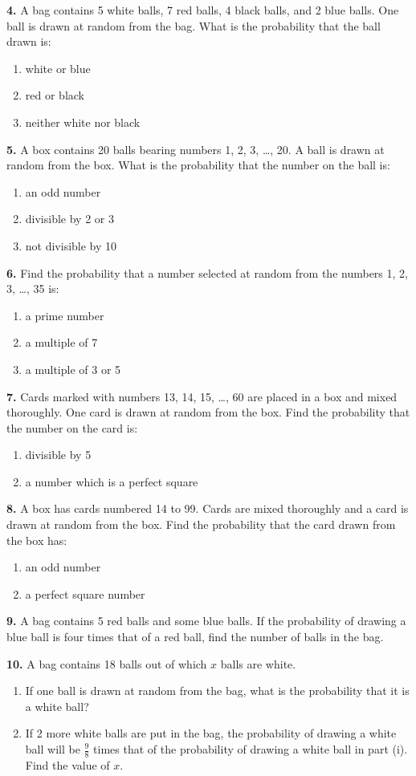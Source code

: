 \documentclass[a4paper, 12pt]{article}
\begin{document}
\begin{multicols}{2}
	\textbf{4.} A bag contains 5 white balls, 7 red balls, 4 black balls, and 2 blue balls. One ball is drawn at random from the bag. What is the probability that the ball drawn is:
	\begin{enumerate}
		\item white or blue
		\item red or black
		\item neither white nor black
	\end{enumerate}
	
	\textbf{5.} A box contains 20 balls bearing numbers 1, 2, 3, \dots, 20. A ball is drawn at random from the box. What is the probability that the number on the ball is:
	\begin{enumerate}
		\item an odd number
		\item divisible by 2 or 3
		\item not divisible by 10
	\end{enumerate}
	
	\textbf{6.} Find the probability that a number selected at random from the numbers 1, 2, 3, \dots, 35 is:
	\begin{enumerate}
		\item a prime number
		\item a multiple of 7
		\item a multiple of 3 or 5
	\end{enumerate}
	
	\textbf{7.} Cards marked with numbers 13, 14, 15, \dots, 60 are placed in a box and mixed thoroughly. One card is drawn at random from the box. Find the probability that the number on the card is:
	\begin{enumerate}
		\item divisible by 5
		\item a number which is a perfect square
	\end{enumerate}
	
	\textbf{8.} A box has cards numbered 14 to 99. Cards are mixed thoroughly and a card is drawn at random from the box. Find the probability that the card drawn from the box has:
	\begin{enumerate}
		\item an odd number
		\item a perfect square number
	\end{enumerate}
	
	\textbf{9.} A bag contains 5 red balls and some blue balls. If the probability of drawing a blue ball is four times that of a red ball, find the number of balls in the bag.
	
	\textbf{10.} A bag contains 18 balls out of which $x$ balls are white.
	\begin{enumerate}
		\item If one ball is drawn at random from the bag, what is the probability that it is a white ball?
		\item If 2 more white balls are put in the bag, the probability of drawing a white ball will be $\frac{9}{8}$ times that of the probability of drawing a white ball in part (i). Find the value of $x$.
	\end{enumerate}
\end{multicols}

\center{******************}	
\end{document}
